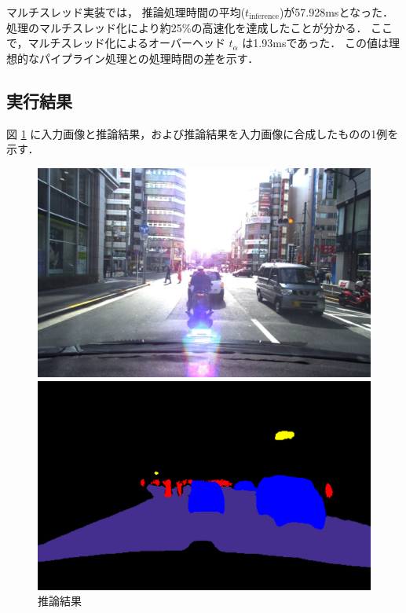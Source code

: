 マルチスレッド実装では，
推論処理時間の平均($t_{\mathrm{inference}}$)が57.928msとなった．
処理のマルチスレッド化により約25\%の高速化を達成したことが分かる．
ここで，マルチスレッド化によるオーバーヘッド $t_\alpha$ は1.93msであった．
この値は理想的なパイプライン処理との処理時間の差を示す．

\subsection{実行結果}

図 \ref{estimate_result} に入力画像と推論結果，および推論結果を入力画像に合成したものの1例を示す．

\begin{figure}[h]
  \begin{center}
    \label{estimate_result}
    \caption{推論結果}
    \begin{minipage}{0.32\hsize}
      \begin{center}
        \includegraphics[width=\linewidth]{./figures/orig.jpg}
      \end{center}
    \end{minipage}
    \begin{minipage}{0.32\hsize}
      \begin{center}
        \includegraphics[width=\linewidth]{./figures/label.png}

\end{center}
\end{minipage}
\end{center}
\end{figure}
